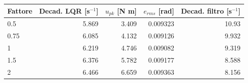 \begin{center}\small\begin{tabular}{lrrrr}\toprule
Fattore & Decad. LQR [s$^{-1}$] & $u_{pk}$ [N m] & $e_{rms}$ [rad] & Decad. filtro [s$^{-1}$]\\\midrule
0.5 & 5.869 & 3.409 & 0.009323 & 10.93\\
0.75 & 6.085 & 4.132 & 0.009126 & 9.932\\
1 & 6.219 & 4.746 & 0.009082 & 9.319\\
1.5 & 6.376 & 5.782 & 0.009177 & 8.588\\
2 & 6.466 & 6.659 & 0.009363 & 8.156\\
\bottomrule\end{tabular}
\end{center}
